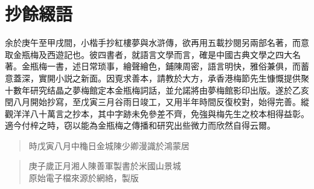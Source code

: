 \chapter*{抄餘綴語}


余於庚午至甲戌間，小楷手抄紅樓夢與水滸傳，欲再用五載抄閱另兩部名著，而意取金瓶梅及西遊記也。彼四書者，就語言文學而言，確是中國古典文學之四大名著。金瓶梅一書，述日常琐事，繪聲繪色，鋪陳周密，語言明快，雅俗兼俱，而蓄意蓋深，實開小説之新面。因覔求善本，請教於大方，承香港梅節先生慷慨提供聚十數年研究结晶之夢梅館定本金瓶梅詞話，並允諾將由夢梅館影印出版。遂於乙亥閏八月開始抄寫，至戊寅三月谷雨日竣工，又用半年時間反復校對，始得完善。縱觀洋洋八十萬言之抄本，其中字跡未免參差不齊，免強與梅先生之校本相得益彰。適今付梓之時，窃以能為金瓶梅之傳播和研究出些微力而欣然自得云爾。

\begin{quotation}\begin{flushright}時戊寅八月中龝日金城陳少卿漫識於鴻蒙居\end{flushright}\end{quotation}


\begin{quotation}\small\color{gray}

\begin{flushright}
庚子歲正月湘人陳善軍製書於米國山景城\\
原始電子檔來源於網絡，\quad{\LaTeX}製版
\end{flushright}
\end{quotation}

{\insertauthorlog}


